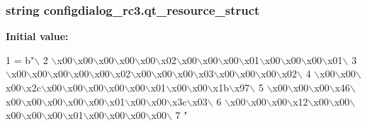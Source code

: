 \subsubsection[{qt\+\_\+resource\+\_\+struct}]{\setlength{\rightskip}{0pt plus 5cm}string configdialog\+\_\+rc3.\+qt\+\_\+resource\+\_\+struct}\label{namespaceconfigdialog__rc3_a50ec9551a706019e5bfe82a15a181842}
{\bfseries Initial value\+:}
\begin{DoxyCode}
1 = b\textcolor{stringliteral}{"\(\backslash\)}
2 \textcolor{stringliteral}{\(\backslash\)x00\(\backslash\)x00\(\backslash\)x00\(\backslash\)x00\(\backslash\)x00\(\backslash\)x02\(\backslash\)x00\(\backslash\)x00\(\backslash\)x00\(\backslash\)x01\(\backslash\)x00\(\backslash\)x00\(\backslash\)x00\(\backslash\)x01\(\backslash\)}
3 \textcolor{stringliteral}{\(\backslash\)x00\(\backslash\)x00\(\backslash\)x00\(\backslash\)x00\(\backslash\)x00\(\backslash\)x02\(\backslash\)x00\(\backslash\)x00\(\backslash\)x00\(\backslash\)x03\(\backslash\)x00\(\backslash\)x00\(\backslash\)x00\(\backslash\)x02\(\backslash\)}
4 \textcolor{stringliteral}{\(\backslash\)x00\(\backslash\)x00\(\backslash\)x00\(\backslash\)x2c\(\backslash\)x00\(\backslash\)x00\(\backslash\)x00\(\backslash\)x00\(\backslash\)x00\(\backslash\)x01\(\backslash\)x00\(\backslash\)x00\(\backslash\)x1b\(\backslash\)x97\(\backslash\)}
5 \textcolor{stringliteral}{\(\backslash\)x00\(\backslash\)x00\(\backslash\)x00\(\backslash\)x46\(\backslash\)x00\(\backslash\)x00\(\backslash\)x00\(\backslash\)x00\(\backslash\)x00\(\backslash\)x01\(\backslash\)x00\(\backslash\)x00\(\backslash\)x3c\(\backslash\)x03\(\backslash\)}
6 \textcolor{stringliteral}{\(\backslash\)x00\(\backslash\)x00\(\backslash\)x00\(\backslash\)x12\(\backslash\)x00\(\backslash\)x00\(\backslash\)x00\(\backslash\)x00\(\backslash\)x00\(\backslash\)x01\(\backslash\)x00\(\backslash\)x00\(\backslash\)x00\(\backslash\)x00\(\backslash\)}
7 \textcolor{stringliteral}{"}
\end{DoxyCode}
